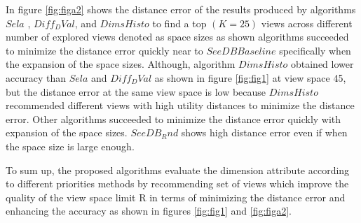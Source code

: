 
In figure \ref{fig:figa2} shows the distance error of the results produced by
algorithms $Sela$ , $Diff_DVal$, and $DimsHisto$ to find a top $(K=25)$ views
 across different number of explored views denoted as 
space sizes as shown algorithms succeeded to minimize the distance error quickly near to $SeeDB Baseline$
specifically when the  
expansion of the space sizes. Although, algorithm $DimsHisto$ obtained lower 
accuracy than $Sela$ and $Diff_DVal$ as shown in figure \ref{fig:fig1} at view space 45, but the 
distance error at the same view space is low because $DimsHisto$ recommended 
different views with high utility distances to minimize the distance error.
Other algorithms succeeded to minimize the distance error quickly with 
expansion of the space sizes. 
$SeeDB_Rnd$ shows high distance error even if when the space size is large enough. 

To sum up, the proposed algorithms evaluate the 
dimension attribute according to different priorities methods by recommending set of views 
which improve the quality of the view space limit R in terms of minimizing the distance error and 
enhancing the accuracy as shown in figures \ref{fig:fig1} and  \ref{fig:figa2}.
  

